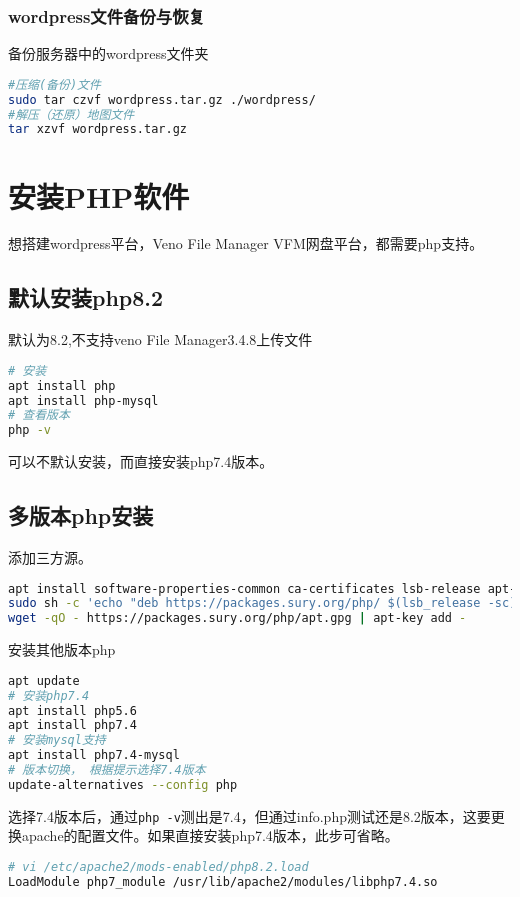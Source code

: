 \documentclass[UTF8,a4paper,12pt]{ctexbook} %
\begin{document}
\subsection{wordpress文件备份与恢复}
备份服务器中的wordpress文件夹
\begin{lstlisting}[language={bash}]
#压缩(备份)文件
sudo tar czvf wordpress.tar.gz ./wordpress/
#解压（还原）地图文件
tar xzvf wordpress.tar.gz
\end{lstlisting}

\chapter{安装PHP软件}
想搭建wordpress平台，Veno File Manager VFM网盘平台，都需要php支持。
\section{默认安装php8.2}
默认为8.2,不支持veno File Manager3.4.8上传文件
\begin{lstlisting}[language={bash}]
# 安装
apt install php
apt install php-mysql
# 查看版本
php -v
\end{lstlisting}
可以不默认安装，而直接安装php7.4版本。

\section{多版本php安装}
添加三方源。
\begin{lstlisting}[language={bash}]
apt install software-properties-common ca-certificates lsb-release apt-transport-https
sudo sh -c 'echo "deb https://packages.sury.org/php/ $(lsb_release -sc) main" > /etc/apt/sources.list.d/php.list'
wget -qO - https://packages.sury.org/php/apt.gpg | apt-key add -
\end{lstlisting}


安装其他版本php
\begin{lstlisting}[language={bash}]
apt update
# 安装php7.4
apt install php5.6
apt install php7.4
# 安装mysql支持
apt install php7.4-mysql
# 版本切换， 根据提示选择7.4版本
update-alternatives --config php
\end{lstlisting}

选择7.4版本后，通过\verb|php -v|测出是7.4，但通过info.php测试还是8.2版本，这要更换apache的配置文件。如果直接安装php7.4版本，此步可省略。
\begin{lstlisting}[language={bash}]
# vi /etc/apache2/mods-enabled/php8.2.load
LoadModule php7_module /usr/lib/apache2/modules/libphp7.4.so
\end{lstlisting}
\end{document}

